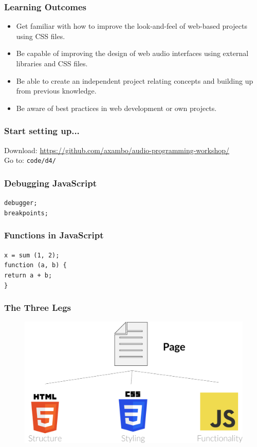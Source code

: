 \documentclass[screen, aspectratio=43]{beamer}
\begin{document}
%
\begin{frame}
\frametitle{Learning Outcomes}
\begin{itemize}
\item Get familiar with how to improve the look-and-feel of web-based projects using CSS files.
\item Be capable of improving the design of web audio interfaces using external libraries and CSS files.
\item Be able to create an independent project relating concepts and building up from previous knowledge.
\item Be aware of best practices in web development or own projects.
\end{itemize}
\end{frame}
%
\begin{frame}
\frametitle{Start setting up...}
Download: \url{https://github.com/axambo/audio-programming-workshop/} 
\\
\vspace{10 mm}
Go to: \texttt{code/d4/}
\end{frame}
%	
\begin{frame}
\frametitle{Debugging JavaScript}
 \texttt{debugger;}\\
 \texttt{breakpoints;} 
\end{frame}
%
\begin{frame}
\frametitle{Functions in JavaScript}
\texttt{x = sum (1, 2);}\\
\vspace{10 mm}
\texttt{function (a, b) \{}\\
\setlength\parindent{24pt} \texttt{return a + b;}\\
\setlength\parindent{0pt}\texttt{\}}
\end{frame}
%
\begin{frame}
\frametitle{The Three Legs}
   \begin{figure}
	\includegraphics[scale=0.2]{img/three-legs-codeanalogies-blog.png}
    \end{figure}
\vspace{10 mm}
\end{frame}
\end{document}
